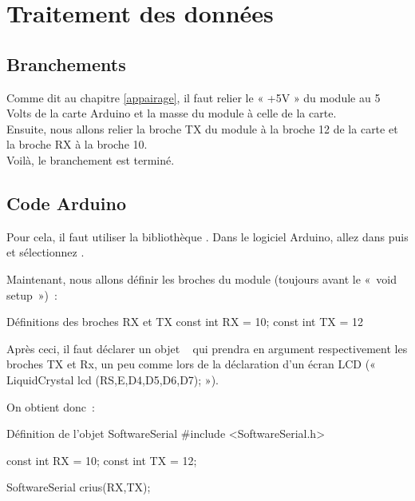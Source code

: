 \chapter{Traitement des données}

\section{Branchements}

Comme dit au chapitre \ref{appairage}, il faut relier le « +5V » du module au  5 Volts de la carte Arduino et la masse du module à celle de la carte.\\
Ensuite, nous allons relier la broche TX du module à la broche 12 de la carte et la broche RX à la broche 10. \\
Voilà, le branchement est terminé.

\section{Code Arduino}


Pour cela, il faut utiliser la bibliothèque .
Dans le logiciel Arduino, allez dans  puis   et sélectionnez .


Maintenant, nous allons définir les broches du module (toujours avant le « void setup ») :

\begin{Cpp}{Définitions des broches RX et TX}
const int RX = 10;
const int TX = 12
\end{Cpp}

Après ceci, il faut déclarer un objet   qui prendra en argument respectivement les broches TX et Rx, un peu comme lors de la déclaration d'un écran LCD (« LiquidCrystal lcd (RS,E,D4,D5,D6,D7); »).

On obtient donc :

\begin{Cpp}{Définition de l'objet SoftwareSerial}
#include <SoftwareSerial.h>

const int RX = 10;
const int TX = 12;

SoftwareSerial crius(RX,TX);
\end{Cpp}

